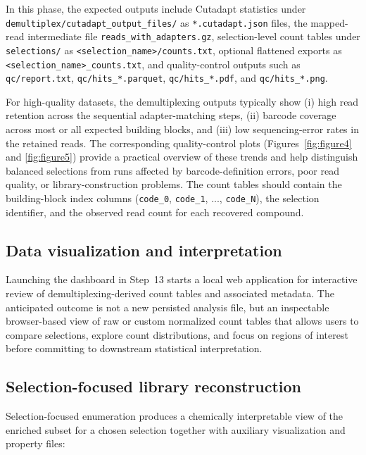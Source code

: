 \documentclass[pdflatex,sn-nature]{sn-jnl}
\begin{document}
In this phase, the expected outputs include Cutadapt statistics under \texttt{demultiplex/cutadapt\_output\_files/} as \texttt{*.cutadapt.json} files, the mapped-read intermediate file \texttt{reads\_with\_adapters.gz}, selection-level count tables under \texttt{selections/} as \texttt{<selection\_name>/counts.txt}, optional flattened exports as \texttt{<selection\_name>\_counts.txt}, and quality-control outputs such as \texttt{qc/report.txt}, \texttt{qc/hits\_*.parquet}, \texttt{qc/hits\_*.pdf}, and \texttt{qc/hits\_*.png}.

For high-quality datasets, the demultiplexing outputs typically show (i) high read retention across the sequential adapter-matching steps, (ii) barcode coverage across most or all expected building blocks, and (iii) low sequencing-error rates in the retained reads. The corresponding quality-control plots (Figures~\ref{fig:figure4} and \ref{fig:figure5}) provide a practical overview of these trends and help distinguish balanced selections from runs affected by barcode-definition errors, poor read quality, or library-construction problems. The count tables should contain the building-block index columns (\texttt{code\_0}, \texttt{code\_1}, ..., \texttt{code\_N}), the selection identifier, and the observed read count for each recovered compound.

\subsection{Data visualization and interpretation}
Launching the dashboard in Step~13 starts a local web application for interactive review of demultiplexing-derived count tables and associated metadata. The anticipated outcome is not a new persisted analysis file, but an inspectable browser-based view of raw or custom normalized count tables that allows users to compare selections, explore count distributions, and focus on regions of interest before committing to downstream statistical interpretation.

\subsection{Selection-focused library reconstruction}
Selection-focused enumeration produces a chemically interpretable view of the enriched subset for a chosen selection together with auxiliary visualization and property files:
\end{document}
